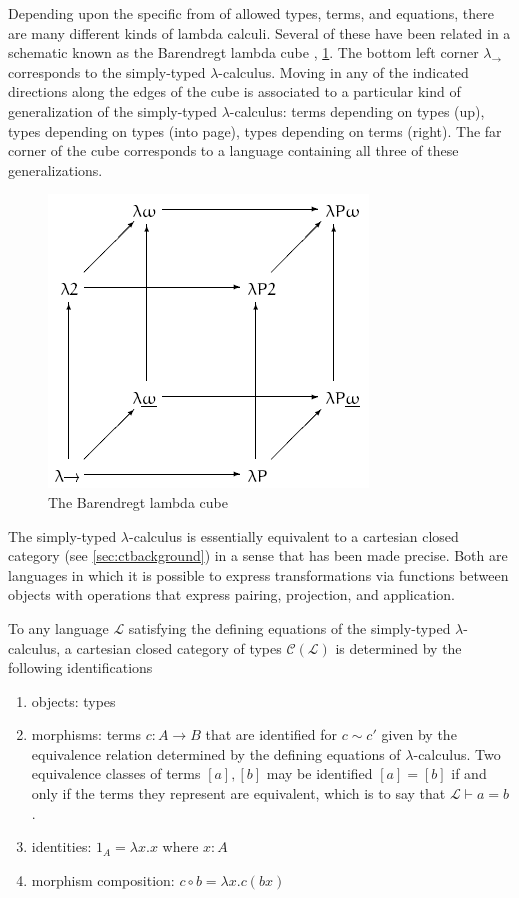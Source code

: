\documentclass[10pt]{article}
\theoremstyle{plain}
\theoremstyle{definition}
\theoremstyle{remark}
\begin{document}
Depending upon the specific from of allowed types, terms, and equations, there are many different kinds of lambda calculi. Several of these have been related in a schematic known as the Barendregt lambda cube  \cite{Barendregt1985}, \ref{fig:lambdacube}. The bottom left corner $\lambda_{\rightarrow}$ corresponds to the simply-typed $\lambda$-calculus. Moving in any of the indicated directions along the edges of the cube is associated to a particular kind of generalization of the simply-typed $\lambda$-calculus: terms depending on types (up), types depending on types (into page), types depending on terms (right). The far corner of the cube corresponds to a language containing all three of these generalizations.

\begin{figure}[!htbp]
\centering
\noindent\includegraphics[width=0.5\columnwidth]{fig/lambda-cube.png}
\caption{The Barendregt lambda cube}
\label{fig:lambdacube}
\end{figure}

The simply-typed $\lambda$-calculus is essentially equivalent to a cartesian closed category (see \ref{sec:ctbackground}) in a sense that has been made precise. Both are languages in which it is possible to express transformations via functions between objects with operations that express pairing, projection, and application.

To any language $\mathcal{L}$ satisfying the defining equations of the simply-typed $\lambda$-calculus, a cartesian closed category of types $\mathcal{C}(\mathcal{L})$ is determined by the following identifications \cite{Awodey2000,Awodey2006}
\begin{enumerate}
\item{objects: } types
\item{morphisms: } terms $c \colon A \rightarrow B$ that are identified for $c \sim c'$ given by the equivalence relation determined by the defining equations of $\lambda$-calculus. Two equivalence classes of terms $[a], [b]$ may be identified $[a] = [b]$ if and only if the terms they represent are equivalent, which is to say that  $\mathcal{L} \vdash a = b$.
\item{identities: } $1_A = \lambda x.x$ where $x \colon A$
\item{morphism composition: } $c \circ b = \lambda x.c(bx)$
\end{enumerate}
\end{document}
